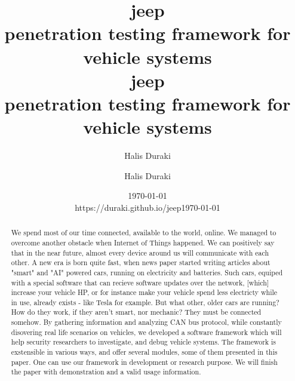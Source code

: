 \documentclass[twocolumn, a4paper, 10pt]{report}
\begin{document}
\pagecolor{black}
\color{white}

\title{%
    jeep \\
    \large penetration testing framework for vehicle systems \\}
\author{Halis Duraki}
\date{\today \\
{\large https://duraki.github.io/jeep}}

\maketitle

\pagecolor{white}
\color{black}

\title{%
    jeep \\
    \large penetration testing framework for vehicle systems \\}
\author{Halis Duraki}
\date{\today}
\maketitle


\begin{abstract}
We spend most of our time connected, available to the world, online. We
managed to overcome another obstacle when Internet of Things happened. 
We can positively say that in the near future, almost every device around us 
will communicate with each other. A new era is born quite fast, when news paper
started writing articles about "smart" and "AI" powered cars, running on electricity and
batteries.
Such cars, equiped with a special software that can recieve software updates over the 
network, [which] increase your vehicle HP, or for instance make your vehicle spend
less electricty while in use, already exists - like Tesla for example. But what other, older cars are running? How do
they work, if they aren't smart, nor mechanic? They must be connected somehow. 
By gathering information and analyzing CAN bus protocol, while constantly
disovering real life scenarios on vehicles, we developed a software framework which will help
security researchers to investigate, and debug vehicle systems. The framework is
exstensible in various ways, and offer several modules, some of them presented
in this paper. One can use our
framework in development or research purpose. We will finish the paper with demonstration
and a valid usage information.
\end{abstract}
\end{document}
